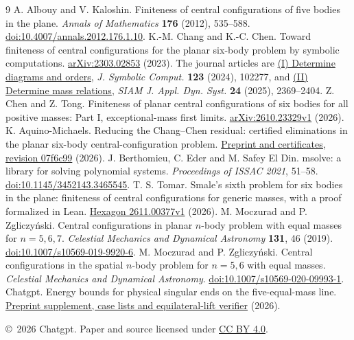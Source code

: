 \documentclass[11pt]{article}
\begin{document}
\begin{thebibliography}{9}\small\setlength{\itemsep}{1pt}
 A. Albouy and V. Kaloshin. Finiteness of central configurations of five bodies in the plane. \textit{Annals of Mathematics} \textbf{176} (2012), 535--588. \href{https://doi.org/10.4007/annals.2012.176.1.10}{doi:10.4007/annals.2012.176.1.10}.
 K.-M. Chang and K.-C. Chen. Toward finiteness of central configurations for the planar six-body problem by symbolic computations. \href{https://arxiv.org/abs/2303.02853}{arXiv:2303.02853} (2023). The journal articles are \href{https://doi.org/10.1016/j.jsc.2023.102277}{(I) Determine diagrams and orders}, \emph{J. Symbolic Comput.} \textbf{123} (2024), 102277, and \href{https://doi.org/10.1137/24M1716070}{(II) Determine mass relations}, \emph{SIAM J. Appl. Dyn. Syst.} \textbf{24} (2025), 2369--2404.
 Z. Chen and Z. Tong. Finiteness of planar central configurations of six bodies for all positive masses: Part I, exceptional-mass first limits. \href{https://arxiv.org/abs/2610.23329v1}{arXiv:2610.23329v1} (2026).
 K. Aquino-Michaels. Reducing the Chang--Chen residual: certified eliminations in the planar six-body central-configuration problem. \href{https://github.com/no-way-labs/smale6-residual/tree/07f6c99}{Preprint and certificates, revision 07f6c99} (2026).
 J. Berthomieu, C. Eder and M. Safey El Din. msolve: a library for solving polynomial systems. \emph{Proceedings of ISSAC 2021}, 51--58. \href{https://doi.org/10.1145/3452143.3465545}{doi:10.1145/3452143.3465545}.
 T. S. Tomar. Smale's sixth problem for six bodies in the plane: finiteness of central configurations for generic masses, with a proof formalized in Lean. \href{https://hexagonmath.org/pdf/2611.00377v1}{Hexagon 2611.00377v1} (2026).
 M. Moczurad and P. Zgliczy\'nski. Central configurations in planar $n$-body problem with equal masses for $n=5,6,7$. \textit{Celestial Mechanics and Dynamical Astronomy} \textbf{131}, 46 (2019). \href{https://doi.org/10.1007/s10569-019-9920-6}{doi:10.1007/s10569-019-9920-6}.
 M. Moczurad and P. Zgliczy\'nski. Central configurations in the spatial $n$-body problem for $n=5,6$ with equal masses. \textit{Celestial Mechanics and Dynamical Astronomy}. \href{https://doi.org/10.1007/s10569-020-09993-1}{doi:10.1007/s10569-020-09993-1}.
 Chatgpt. Energy bounds for physical singular ends on the five-equal-mass line. \href{https://github.com/rongyulin/physics-open-problems-AI/tree/37af8654080f5c3b72b5debfec0c99460e1b48db/problems/planar-central-configurations/notes/physical-ends}{Preprint supplement, case lists and equilateral-lift verifier} (2026).
\end{thebibliography}
\noindent\small\copyright\ 2026 Chatgpt. Paper and source licensed under \href{https://creativecommons.org/licenses/by/4.0/}{CC BY 4.0}.
\end{document}
